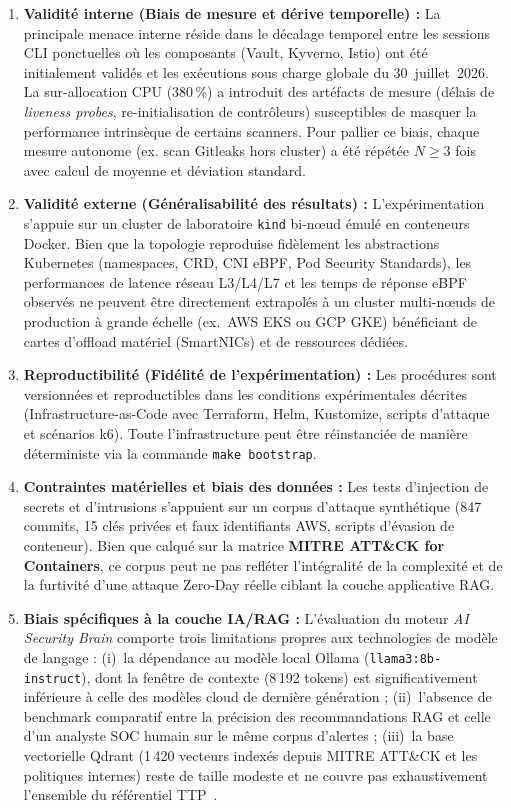 \begin{enumerate}
    \item \textbf{Validité interne (Biais de mesure et dérive temporelle) :} La principale menace interne réside dans le décalage temporel entre les sessions CLI ponctuelles où les composants (Vault, Kyverno, Istio) ont été initialement validés et les exécutions sous charge globale du 30~juillet~2026. La sur-allocation CPU ($380\,\%$) a introduit des artéfacts de mesure (délais de \textit{liveness probes}, re-initialisation de contrôleurs) susceptibles de masquer la performance intrinsèque de certains scanners. Pour pallier ce biais, chaque mesure autonome (ex. scan Gitleaks hors cluster) a été répétée $N \ge 3$ fois avec calcul de moyenne et déviation standard.
    \item \textbf{Validité externe (Généralisabilité des résultats) :} L'expérimentation s'appuie sur un cluster de laboratoire \texttt{kind} bi-nœud émulé en conteneurs Docker. Bien que la topologie reproduise fidèlement les abstractions Kubernetes (namespaces, CRD, CNI eBPF, Pod Security Standards), les performances de latence réseau L3/L4/L7 et les temps de réponse eBPF observés ne peuvent être directement extrapolés à un cluster multi-nœuds de production à grande échelle (ex.~AWS EKS ou GCP GKE) bénéficiant de cartes d'offload matériel (SmartNICs) et de ressources dédiées.
    \item \textbf{Reproductibilité (Fidélité de l'expérimentation) :} Les procédures sont versionnées et reproductibles dans les conditions expérimentales décrites (Infrastructure-as-Code avec Terraform, Helm, Kustomize, scripts d'attaque et scénarios k6). Toute l'infrastructure peut être réinstanciée de manière déterministe via la commande \texttt{make bootstrap}.
    \item \textbf{Contraintes matérielles et biais des données :} Les tests d'injection de secrets et d'intrusions s'appuient sur un corpus d'attaque synthétique (847 commits, 15 clés privées et faux identifiants AWS, scripts d'évasion de conteneur). Bien que calqué sur la matrice \textbf{MITRE ATT\&CK for Containers}, ce corpus peut ne pas refléter l'intégralité de la complexité et de la furtivité d'une attaque Zero-Day réelle ciblant la couche applicative RAG.
    \item \textbf{Biais spécifiques à la couche IA/RAG :} L'évaluation du moteur \textit{AI Security Brain} comporte trois limitations propres aux technologies de modèle de langage : (i)~la dépendance au modèle local Ollama (\texttt{llama3:8b-instruct}), dont la fenêtre de contexte (8\,192 tokens) est significativement inférieure à celle des modèles cloud de dernière génération ; (ii)~l'absence de benchmark comparatif entre la précision des recommandations RAG et celle d'un analyste SOC humain sur le même corpus d'alertes ; (iii)~la base vectorielle Qdrant (1\,420 vecteurs indexés depuis MITRE ATT\&CK et les politiques internes) reste de taille modeste et ne couvre pas exhaustivement l'ensemble du référentiel TTP~\cite{greshake_prompt_injection_2023}.
\end{enumerate}

